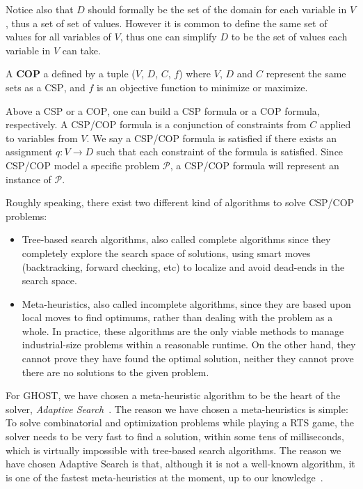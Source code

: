 \documentclass[journal]{IEEEtran}
\newcommand{\csp}{\textsc{CSP}\xspace}
\newcommand{\cop}{\textsc{COP}\xspace}
\newcommand{\ghost}{\textsc{GHOST}\xspace}
\begin{document}
Notice also that $D$ should formally be the set of the domain for each
variable in $V$, thus a set of  set of values. However it is common to
define the same set  of values for all variables of  $V$, thus one can
simplify $D$ to be the set of values each variable in $V$ can take.

A {\bf \cop} a defined by a tuple ($V$, $D$, $C$, $f$) where $V$, $D$ and
$C$  represent the  same  sets as  a  \csp, and  $f$  is an  objective
function to minimize  or maximize.

Above  a \csp  or a  \cop, one  can  build a  \csp formula  or a  \cop
formula,  respectively.   A  \csp/\cop  formula is  a  conjunction  of
constraints from $C$ applied to variables from $V$. We say a \csp/\cop
formula is satisfied  if there exists an assignment  $q: V \rightarrow
D$  such that  each constraint  of  the formula  is satisfied.   Since
\csp/\cop model a specific  problem $\mathcal{P}$, a \csp/\cop formula
will represent an instance of $\mathcal{P}$.

Roughly  speaking, there  exist two  different kind  of algorithms  to
solve \csp/\cop problems: 
\begin{itemize}
\item Tree-based  search algorithms,  also called  complete algorithms
  since they completely  explore the search space  of solutions, using
  smart moves  (backtracking, forward  checking, etc) to  localize and
  avoid dead-ends in the search space.
\item Meta-heuristics,  also called incomplete algorithms,  since they
  are based  upon local  moves to find  optimums, rather  than dealing
  with the problem  as a whole. In practice, these  algorithms are the
  only  viable methods  to  manage industrial-size  problems within  a
  reasonable runtime. On  the other hand, they cannot  prove they have
  found the optimal  solution, neither they cannot prove  there are no
  solutions to the given problem.
\end{itemize}

For \ghost, we have chosen a  meta-heuristic algorithm to be the heart
of the solver, {\it  Adaptive Search}~\cite{Codognet01}. The reason we
have chosen  a meta-heuristics is  simple: To solve  combinatorial and
optimization problems while playing a RTS game, the solver needs to be
very fast to find a solution,  within some tens of milliseconds, which
is virtually impossible with  tree-based search algorithms. The reason
we  have  chosen  Adaptive  Search  is that,  although  it  is  not  a
well-known algorithm, it is one  of the fastest meta-heuristics at the
moment, up to our knowledge~\cite{Caniou14}.
\end{document}
